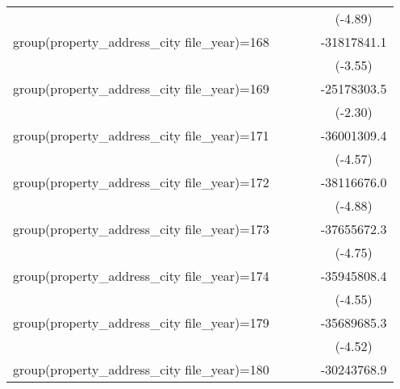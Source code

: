 {\begin{tabular}{l*{4}{c}}
                    &                     &                     &                     &     (-4.89)         \\
\addlinespace
group(property\_address\_city file\_year)=168&                     &                     &                     & -31817841.1\sym{***}\\
                    &                     &                     &                     &     (-3.55)         \\
\addlinespace
group(property\_address\_city file\_year)=169&                     &                     &                     & -25178303.5\sym{*}  \\
                    &                     &                     &                     &     (-2.30)         \\
\addlinespace
group(property\_address\_city file\_year)=171&                     &                     &                     & -36001309.4\sym{***}\\
                    &                     &                     &                     &     (-4.57)         \\
\addlinespace
group(property\_address\_city file\_year)=172&                     &                     &                     & -38116676.0\sym{***}\\
                    &                     &                     &                     &     (-4.88)         \\
\addlinespace
group(property\_address\_city file\_year)=173&                     &                     &                     & -37655672.3\sym{***}\\
                    &                     &                     &                     &     (-4.75)         \\
\addlinespace
group(property\_address\_city file\_year)=174&                     &                     &                     & -35945808.4\sym{***}\\
                    &                     &                     &                     &     (-4.55)         \\
\addlinespace
group(property\_address\_city file\_year)=179&                     &                     &                     & -35689685.3\sym{***}\\
                    &                     &                     &                     &     (-4.52)         \\
\addlinespace
group(property\_address\_city file\_year)=180&                     &                     &                     & -30243768.9\sym{***}\\

\end{tabular}}
